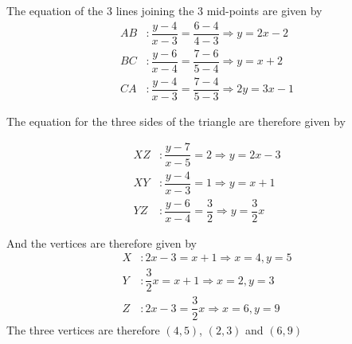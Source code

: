 \begin{solution}
	The equation of the 3 lines joining the 3 mid-points are given by
	\begin{align}
		AB &: \dfrac{y-4}{x-3} = \dfrac{6-4}{4-3} \Rightarrow y = 2x - 2 \\
		BC &: \dfrac{y-6}{x-4} = \dfrac{7-6}{5-4} \Rightarrow y = x + 2 \\
		CA &: \dfrac{y-4}{x-3} = \dfrac{7-4}{5-3} \Rightarrow 2y = 3x - 1
	\end{align}
	
	The equation for the three sides of the triangle are therefore given by
	
	\begin{align}
		XZ &: \dfrac{y-7}{x-5} = 2 \Rightarrow y = 2x - 3 \\
		XY &: \dfrac{y-4}{x-3} = 1 \Rightarrow y = x + 1 \\
		YZ &: \dfrac{y-6}{x-4} = \dfrac{3}{2} \Rightarrow y = \dfrac{3}{2}x
	\end{align}
	
	And the vertices are therefore given by
	\begin{align}
		X &: 2x-3 = x + 1 \Rightarrow x = 4, y = 5 \\
		Y &: \dfrac{3}{2}x = x + 1 \Rightarrow x = 2, y = 3 \\
		Z &: 2x-3 = \dfrac{3}{2}x \Rightarrow x = 6, y = 9
	\end{align}
	The three vertices are therefore $(4,5)$, $(2,3)$ and $(6,9)$
	
	
	
	
	
\end{solution}
